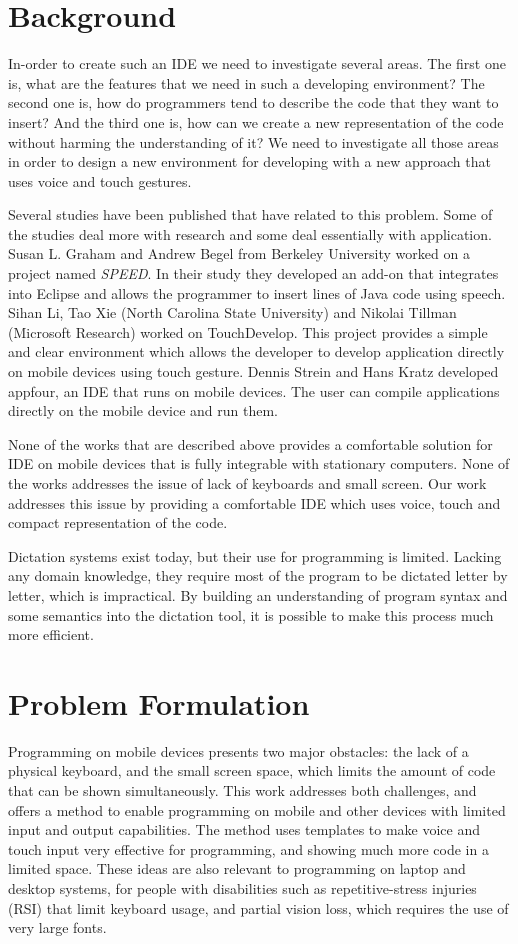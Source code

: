 \section{Background}
In-order to create such an IDE we need to investigate several areas. The first one is, what are the features that we need in such a developing environment? The second one is, how do programmers tend to describe the code that they want to insert? And the third one is, how can we create a new representation of the code without harming the understanding of it? We need to investigate all those areas in order to design a new environment for developing with a new approach that uses voice and touch gestures.

Several studies have been published that have related to this problem. Some of the studies deal more with research and some deal essentially with application. Susan L. Graham and Andrew Begel from Berkeley University worked on a project named \textit{SPEED}. In their study they developed an add-on that integrates into Eclipse and allows the programmer to insert lines of Java code using speech. Sihan Li, Tao Xie (North Carolina State University) and Nikolai Tillman (Microsoft Research) worked on TouchDevelop. This project provides a simple and clear environment which allows the developer to develop application directly on mobile devices using touch gesture. Dennis Strein and Hans Kratz developed appfour, an IDE that runs on mobile devices. The user can compile applications directly on the  mobile device and run them.

None of the works that are described above provides a comfortable solution for IDE on mobile devices that is fully integrable with stationary computers. None of the works addresses the issue of lack of keyboards and small screen. 	Our work addresses this issue by providing a comfortable IDE which uses voice, touch and compact representation of the code.

Dictation systems exist today, but their use for programming is limited. Lacking any domain knowledge, they require most of the program to be dictated letter by letter, which is impractical. By building an understanding of program syntax and some semantics into the dictation tool, it is possible to make this process much more efficient.
\section{Problem Formulation}
Programming on mobile devices presents two major obstacles: the lack of a physical keyboard, and the small screen space, which limits the amount of code that can be shown simultaneously. This work addresses both challenges, and offers a method to enable programming on mobile and other devices with limited input and output capabilities. The method uses templates to make voice and touch input very effective for programming, and showing much more code in a limited space. These ideas are also relevant to programming on laptop and desktop systems, for people with disabilities such as repetitive-stress injuries (RSI) that limit keyboard usage, and partial vision loss, which requires the use of very large fonts. 

